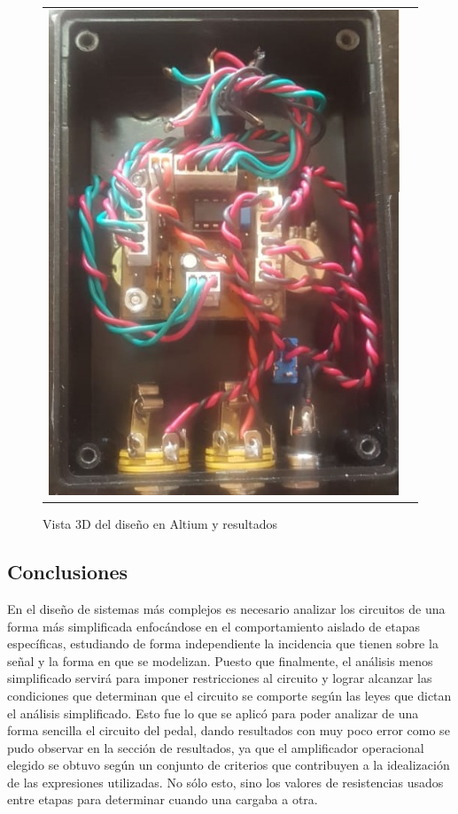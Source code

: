 \begin{figure}[H]
\begin{tabular}{c c}
        \includegraphics[scale=0.6]{../EJ5/Recursos/hecho_frente_2.jpeg}
    \end{tabular}
    \caption{Vista 3D del dise\~no en Altium y resultados}
    \label{}
\end{figure}

\subsection{Conclusiones}
En el dise\~no de sistemas m\'as complejos es necesario analizar los circuitos de una forma m\'as simplificada enfoc\'andose en el comportamiento
aislado de etapas espec\'ificas, estudiando de forma independiente la incidencia que tienen sobre la se\~nal y la forma en que se modelizan. Puesto que finalmente,
el an\'alisis menos simplificado servir\'a para imponer restricciones al circuito y lograr alcanzar las condiciones que determinan que el circuito
se comporte seg\'un las leyes que dictan el an\'alisis simplificado. Esto fue lo que se aplic\'o para poder analizar de una forma sencilla el circuito del pedal,
dando resultados con muy poco error como se pudo observar en la secci\'on de resultados, ya que el amplificador operacional elegido se obtuvo seg\'un un conjunto de criterios
que contribuyen a la idealizaci\'on de las expresiones utilizadas. No s\'olo esto, sino los valores de resistencias usados entre etapas para determinar cuando una cargaba a otra.
